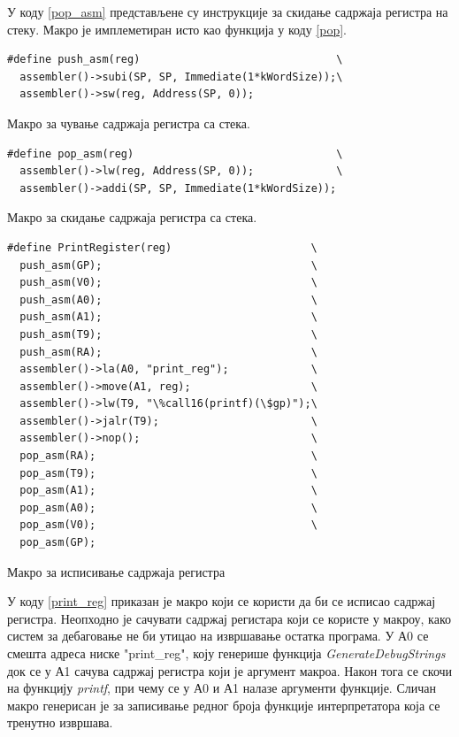 \documentclass[12pt,oneside]{memoir}
\begin{document}
У коду \ref{pop_asm} представљене су инструкције за скидање садржаја регистра на стеку. Макро је имплеметиран исто као функција у коду \ref{pop}. 

\begin{listing}
\begin{verbatim}
#define push_asm(reg)                               \
  assembler()->subi(SP, SP, Immediate(1*kWordSize));\
  assembler()->sw(reg, Address(SP, 0));
\end{verbatim}
\caption{Макро за чување садржаја регистра са стека. }
\label{push_asm}
\end{listing}

\begin{listing}
\begin{verbatim}
#define pop_asm(reg)                                \
  assembler()->lw(reg, Address(SP, 0));             \
  assembler()->addi(SP, SP, Immediate(1*kWordSize));
\end{verbatim}
\caption{Макро за скидање садржаја регистра са стека. }
\label{pop_asm}
\end{listing}

\begin{listing}
\begin{verbatim}
#define PrintRegister(reg)                      \
  push_asm(GP);                                 \
  push_asm(V0);                                 \
  push_asm(A0);                                 \
  push_asm(A1);                                 \
  push_asm(T9);                                 \
  push_asm(RA);                                 \
  assembler()->la(A0, "print_reg");             \
  assembler()->move(A1, reg);                   \
  assembler()->lw(T9, "\%call16(printf)(\$gp)");\
  assembler()->jalr(T9);                        \
  assembler()->nop();                           \
  pop_asm(RA);                                  \
  pop_asm(T9);                                  \
  pop_asm(A1);                                  \
  pop_asm(A0);                                  \
  pop_asm(V0);                                  \
  pop_asm(GP);                                  
\end{verbatim}
\caption{Макро за исписивање садржаја регистра }
\label{print_reg}
\end{listing}

У коду \ref{print_reg} приказан је макро који се користи да би се исписао садржај регистра. Неопходно је сачувати садржај регистара који се користе у макроу, како систем за дебаговање не би утицао на извршавање остатка програма. У А0 се смешта адреса ниске "print\_reg", коју генерише функција \textit{GenerateDebugStrings} док се у А1 сачува садржај регистра који је аргумент макроа. Након тога се скочи на функцију \textit{printf}, при чему се у А0 и А1 налазе аргументи функције. Сличан макро генерисан је за записивање редног броја функције интерпретатора која се тренутно извршава.\\
\end{document}
